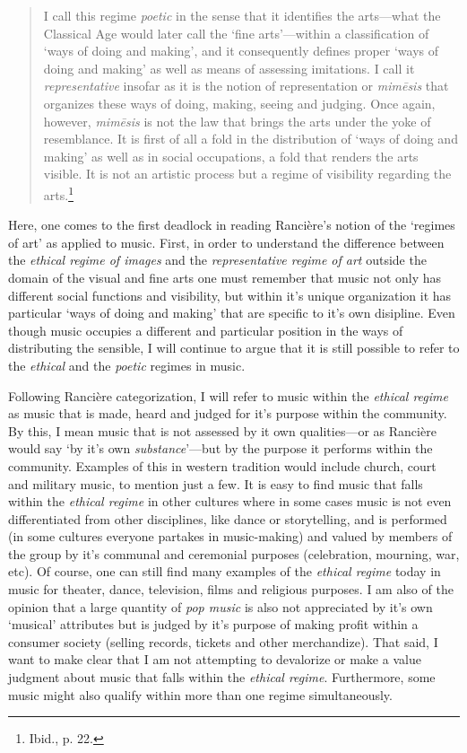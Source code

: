 \begin{quote}
I call this regime \emph{poetic} in the sense that it identifies the arts---what the Classical Age would later call the `fine arts'---within a classification of `ways of doing and making', and it consequently defines proper `ways of doing and making' as well as means of assessing imitations. I call it \emph{representative} insofar as it is the notion of representation or \emph{mim\={e}sis} that organizes these ways of doing, making, seeing and judging. Once again, however, \emph{mim\={e}sis} is not the law that brings the arts under the yoke of resemblance. It is first of all a fold in the distribution of `ways of doing and making' as well as in social occupations, a fold that renders the arts visible. It is not an artistic process but a regime of visibility regarding the arts.\footnote{Ibid., p. 22.}
\end{quote}

Here, one comes to the first deadlock in reading Ranci\`{e}re's notion of the `regimes of art' as applied to music. First, in order to understand the difference between the \emph{ethical regime of images} and the \emph{representative regime of art} outside the domain of the visual and fine arts one must remember that music not only has different social functions and visibility, but within it's unique organization it has particular `ways of doing and making' that are specific to it's own disipline. Even though music occupies a different and particular position in the ways of distributing the sensible, I will continue to argue that it is still possible to refer to the \emph{ethical} and the \emph{poetic} regimes in music. 

Following Ranci\`{e}re categorization, I will refer to music within the \emph{ethical regime} as music that is made, heard and judged for it's purpose within the community. By this, I mean music that is not assessed by it own qualities---or as Ranci\`{e}re would say `by it's own \emph{substance}'---but by the purpose it performs within the community. Examples of this in western tradition would include church, court and military music, to mention just a few. It is easy to find music that falls within the \emph{ethical regime} in other cultures where in some cases music is not even differentiated from other disciplines, like dance or storytelling, and is performed (in some cultures everyone partakes in music-making) and valued by members of the group by it's communal and ceremonial purposes (celebration, mourning, war, etc). Of course, one can still find many examples of the \emph{ethical regime} today in music for theater, dance, television, films and religious purposes. I am also of the opinion that a large quantity of \emph{pop music} is also not appreciated by it's own `musical' attributes but is judged by it's purpose of making profit within a consumer society (selling records, tickets and other merchandize). That said, I want to make clear that I am not attempting to devalorize or make a value judgment about music that falls within the \emph{ethical regime}. Furthermore, some music might also qualify within more than one regime simultaneously.

